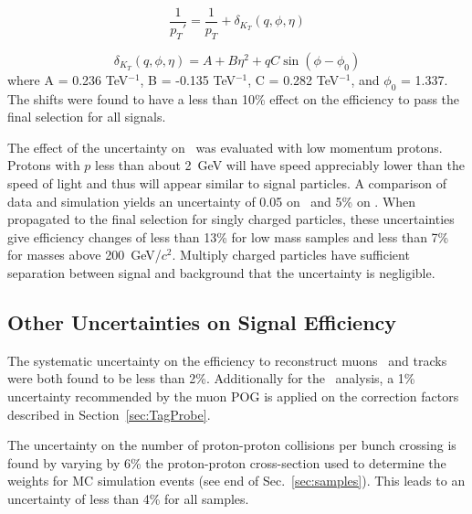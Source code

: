 \begin{equation}
 \frac{1}{p_T\prime} = \frac{1}{p_T} + \delta_{K_T}(q, \phi, \eta)
\end{equation}

\begin{equation}
 \delta_{K_T}(q, \phi, \eta) = A + B\eta^2 + qC\sin(\phi - \phi_0)
\end{equation}
where A = 0.236 TeV$^{-1}$, B = -0.135 TeV$^{-1}$,
C = 0.282 TeV$^{-1}$, and $\phi_0$ = 1.337. The shifts were found to have a less than 10\% effect on the efficiency to pass the final selection for all signals.

The effect of the uncertainty on \dedx\ was evaluated with low momentum protons. Protons with $p$ less than  about 2~GeV will have speed appreciably lower than the
speed of light and thus will appear similar to signal particles. A comparison of data and simulation yields an uncertainty of 0.05 on \ias\ and 5\% on \ih. %
When propagated to the final selection for singly charged particles, these uncertainties give efficiency changes of less than 13\% for low mass samples
and less than 7\% for masses above 200~GeV/$c^2$. Multiply charged particles have sufficient
separation between signal and background that the uncertainty is negligible.


\subsection{Other Uncertainties on Signal Efficiency}

The systematic uncertainty on the efficiency to reconstruct muons~\cite{2012JInst...7P0002T} and tracks~\cite{CMS:2010mua} were both found to be less than 2\%.
Additionally for the \muononly\ analysis, a 1\% uncertainty recommended by the muon POG is applied on the correction factors described in Section~\ref{sec:TagProbe}.

The uncertainty on the number of proton-proton collisions per bunch crossing is found by varying by 6\% the 
proton-proton cross-section used to determine the weights for MC simulation events (see end of Sec.~\ref{sec:samples}).
This leads to an uncertainty of less than 4\% for all samples.

